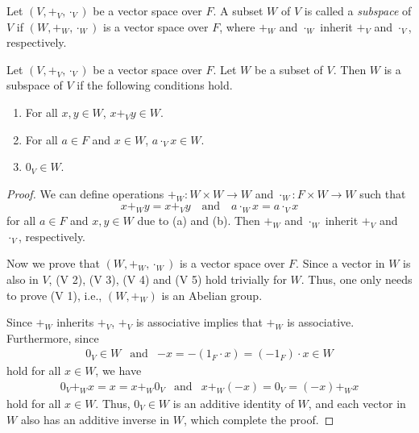 \begin{definition}\label{def:subspace}
  Let $(V, +_V, \cdot_V)$ be a vector space over $F$.
  A subset $W$ of $V$ is called a \emph{subspace} of $V$ if
  $(W, +_W, \cdot_W)$ is a vector space over $F$, where $+_W$ and $\cdot_W$
  inherit $+_V$ and $\cdot_V$, respectively.
\end{definition}

\begin{theorem}\label{thm:subspace}
  Let $(V, +_V, \cdot_V)$ be a vector space over $F$.
  Let $W$ be a subset of $V$.
  Then $W$ is a subspace of $V$ if the following conditions hold.
  \begin{enumerate}
    \item For all $x, y \in W$, $x +_V y \in W$.
    \item For all $a \in F$ and $x \in W$, $a \cdot_V x \in W$.
    \item $0_V \in W$.
  \end{enumerate}
\end{theorem}
\begin{proof}
  We can define operations $+_W: W \times W \to W$
  and $\cdot_W: F \times W \to W$ such that
  \begin{equation*}
    x +_W y = x +_V y
      \quad \text{and}
      \quad a \cdot_W x = a \cdot_V x
  \end{equation*}
  for all $a \in F$ and $x, y \in W$ due to (a) and (b).
  Then $+_W$ and $\cdot_W$ inherit $+_V$ and $\cdot_V$, respectively.

  Now we prove that $(W, +_W, \cdot_W)$ is a vector space over $F$.
  Since a vector in $W$ is also in $V$, (V 2), (V 3), (V 4) and (V 5) hold
  trivially for $W$.
  Thus, one only needs to prove (V 1), i.e., $(W, +_W)$ is an Abelian group.

  Since $+_W$ inherits $+_V$, $+_V$ is associative implies that
  $+_W$ is associative.
  Furthermore, since
  \begin{equation*}
    \begin{array}{lll}
      0_V \in W
        & \text{and}
        & -x = -(1_F \cdot x) = (-1_F) \cdot x \in W
    \end{array}
  \end{equation*}
  hold for all $x \in W$, we have
  \begin{equation*}
    \begin{array}{lll}
      0_V +_W x = x = x +_W 0_V
        & \text{and}
        & x +_W (-x) = 0_V = (-x) +_W x
    \end{array}
  \end{equation*}
  hold for all $x \in W$.
  Thus, $0_V \in W$ is an additive identity of $W$, and each vector in $W$
  also has an additive inverse in $W$, which complete the proof.
\end{proof}

